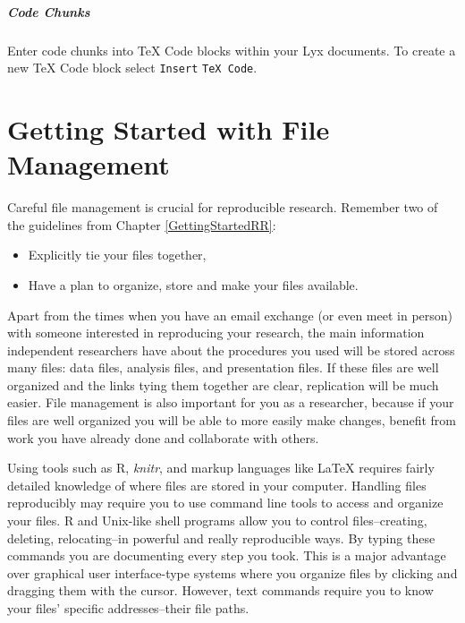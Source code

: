 \documentclass[krantz1]{krantz}
\begin{document}
\paragraph{Code Chunks}

Enter code chunks into TeX Code blocks within your Lyx documents. To create a new TeX Code block select \texttt{Insert} \textrightarrow \texttt{TeX Code}.






\chapter{Getting Started with File Management}\label{DirectoriesChapter}

Careful file management is crucial for reproducible research. Remember two of the guidelines from Chapter \ref{GettingStartedRR}:

\begin{itemize}
    \item Explicitly tie your files together,
    \item Have a plan to organize, store and make your files available. 
\end{itemize}

\noindent Apart from the times when you have an email exchange (or even meet in person) with someone interested in reproducing your research, the main information independent researchers have about the procedures you used will be stored across many files: data files, analysis files, and presentation files. If these files are well organized and the links tying them together are clear, replication will be much easier. File management is also important for you as a researcher, because if your files are well organized you will be able to more easily make changes, benefit from work you have already done and collaborate with others. 

Using tools such as R, {\emph{knitr}}, and markup languages like LaTeX requires fairly detailed knowledge of where files are stored in your computer. Handling files reproducibly may require you to use command line tools to access and organize your files. R and Unix-like shell programs allow you to control files--creating, deleting, relocating--in powerful and really reproducible ways. By typing these commands you are documenting every step you took. This is a major advantage over graphical user interface-type systems where you organize files by clicking and dragging them with the cursor. However, text commands require you to know your files' specific addresses--their file paths. 
\end{document}
